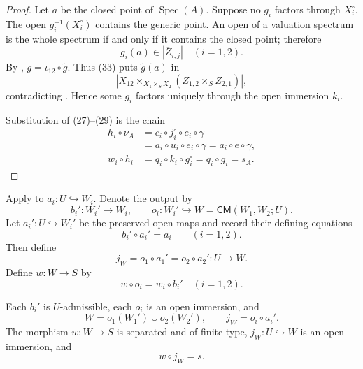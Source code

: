 \begin{proof}
  Let $a$ be the closed point of $\operatorname{Spec}(A)$.  Suppose no $g_i$
  factors through $X_i^\circ$.  The open $g_i^{-1}(X_i^\circ)$ contains the
  generic point.  An open of a valuation spectrum is the whole spectrum if
  and only if it contains the closed point; therefore
  \[
    g_i(a)\in|\overline Z_{i,j}|\quad(i=1,2).                     \tag{33}
  \]
  By ,
  $g=\iota_{12}\circ\widetilde g$.  Thus (33) puts $\widetilde g(a)$ in
  \[
    \left|
      X_{12}\times_{X_1\times_SX_2}
        (\overline Z_{1,2}\times_S\overline Z_{2,1})
    \right|,
  \]
  contradicting .  Hence some
  $g_i$ factors uniquely through the open immersion $k_i$.

  Substitution of (27)--(29) is the chain
  \[
  \begin{aligned}
    h_i\circ\nu_A
      &=c_i\circ j_i^\circ\circ e_i\circ\gamma\\
      &=a_i\circ u_i\circ e_i\circ\gamma
       =a_i\circ e\circ\gamma,\\
    w_i\circ h_i
      &=q_i\circ k_i\circ g_i^\circ
       =q_i\circ g_i
       =s_A.
  \end{aligned}
  \]
\end{proof}

\begin{definition}
  \label{def:nagata-two-open-final-modification}

  Apply  to
  $a_i\colon U\hookrightarrow W_i$.  Denote the output by
  \[
    b_i'\colon W_i'\to W_i,\qquad
    o_i\colon W_i'\hookrightarrow W=\mathsf{CM}(W_1,W_2;U).
  \]
  Let $a_i'\colon U\hookrightarrow W_i'$ be the preserved-open maps and
  record their defining equations
  \[
    b_i'\circ a_i'=a_i\qquad(i=1,2).                             \tag{33a}
  \]
  Then define
  \[
    j_W=o_1\circ a_1'=o_2\circ a_2'\colon U\to W.                 \tag{34}
  \]
  Define $w\colon W\to S$ by
  \[
    w\circ o_i=w_i\circ b_i'\quad(i=1,2).                         \tag{35}
  \]
\end{definition}

\begin{lemma}
  \label{lemma:nagata-two-open-final-modification}

  Each $b_i'$ is $U$-admissible, each $o_i$ is an open immersion, and
  \[
    W=o_1(W_1')\cup o_2(W_2'),\qquad
    j_W=o_i\circ a_i'.
  \]
  The morphism $w\colon W\to S$ is separated and of finite type,
  $j_W\colon U\hookrightarrow W$ is an open immersion, and
  \[
    w\circ j_W=s.
  \]
\end{lemma}


